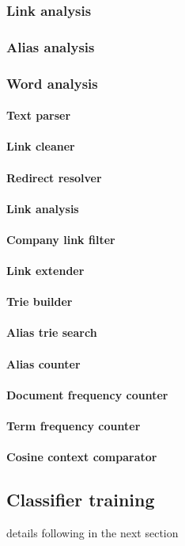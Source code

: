 \subsubsection{Link analysis}
\subsubsection{Alias analysis}
\subsubsection{Word analysis}

\paragraph{Text parser}
\paragraph{Link cleaner}
\paragraph{Redirect resolver}
\paragraph{Link analysis}
\paragraph{Company link filter}
\paragraph{Link extender}
\paragraph{Trie builder}
\paragraph{Alias trie search}
\paragraph{Alias counter}
\paragraph{Document frequency counter}
\paragraph{Term frequency counter}
\paragraph{Cosine context comparator}

\subsection{Classifier training}
details following in the next section